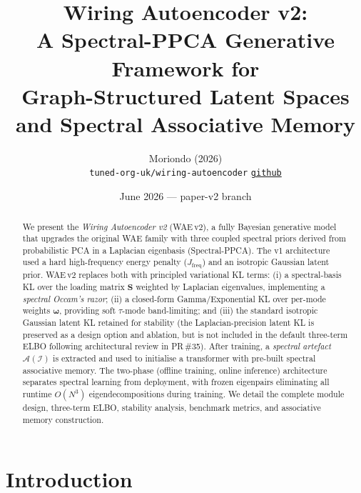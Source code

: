 \documentclass[11pt,a4paper]{article}
\title{%
  \textbf{Wiring Autoencoder v2:}\\[4pt]
  \large A Spectral-PPCA Generative Framework for\\[2pt]
  Graph-Structured Latent Spaces and Spectral Associative Memory
}
\author{%
  Moriondo (2026)\\
  \texttt{tuned-org-uk/wiring-autoencoder}\quad
  \href{https://github.com/tuned-org-uk/wiring-autoencoder}{\texttt{github}}
}
\date{June 2026 --- paper-v2 branch}
\newcommand{\I}{\mathcal{I}}
\newcommand{\A}{\mathcal{A}}
\newcommand{\bS}{\bm{S}}
\newcommand{\bomega}{\bm{\omega}}
\begin{document}
\maketitle

\begin{abstract}
We present the \emph{Wiring Autoencoder v2} (WAE\,v2), a fully Bayesian
generative model that upgrades the original WAE family with three coupled
spectral priors derived from probabilistic PCA in a Laplacian eigenbasis
(Spectral-PPCA).  The v1 architecture used a hard high-frequency energy
penalty ($J_{\mathrm{freq}}$) and an isotropic Gaussian latent prior.  WAE\,v2
replaces both with principled variational KL terms: (i) a spectral-basis KL
over the loading matrix $\bS$ weighted by Laplacian eigenvalues, implementing a
\emph{spectral Occam's razor}; (ii) a closed-form Gamma/Exponential KL over
per-mode weights $\bomega$, providing soft $\tau$-mode band-limiting; and (iii)
the standard isotropic Gaussian latent KL retained for stability (the
Laplacian-precision latent KL is preserved as a design option and ablation, but
is not included in the default three-term ELBO following architectural review in
PR\,\#35).  After training, a \emph{spectral artefact} $\A(\I)$ is extracted
and used to initialise a transformer with pre-built spectral associative memory.
The two-phase (offline training, online inference) architecture separates
spectral learning from deployment, with frozen eigenpairs eliminating all
runtime $O(N^3)$ eigendecompositions during training.  We detail the complete
module design, three-term ELBO, stability analysis, benchmark metrics, and
associative memory construction.
\end{abstract}

\tableofcontents
\newpage

\section{Introduction}
\label{sec:intro}
\end{document}
